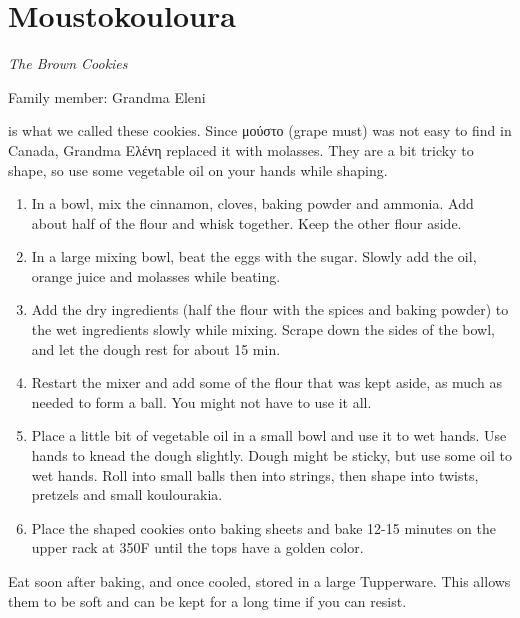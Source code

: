 \chapter{Moustokouloura}
\label{ch:moustokouloura}


\textit{The Brown Cookies}

Family member: Grandma Eleni

 is what we called these cookies. Since \textgreek{μούστο} (grape must) was not easy to find in Canada, Grandma \textgreek{Ελένη} replaced it with molasses. They are a bit tricky to shape, so use some vegetable oil on your hands while shaping.

\begin{enumerate}
    \item In a bowl, mix the cinnamon, cloves, baking powder and ammonia. Add about half of the flour and whisk together. Keep the other flour aside.
    \item In a large mixing bowl, beat the eggs with the sugar. Slowly add the oil, orange juice and molasses while beating.
    \item Add the dry ingredients (half the flour with the spices and baking powder) to the wet ingredients slowly while mixing. Scrape down the sides of the bowl, and let the dough rest for about 15 min.
    \item Restart the mixer and add some of the flour that was kept aside, as much as needed to form a ball. You might not have to use it all.
    \item Place a little bit of vegetable oil in a small bowl and use it to wet hands. Use hands to knead the dough slightly. Dough might be sticky, but use some oil to wet hands. Roll into small balls then into strings, then shape into twists, pretzels and small koulourakia.
    \item Place the shaped cookies onto baking sheets and bake 12-15 minutes on the upper rack at 350\degree F until the tops have a golden color.
\end{enumerate}

Eat soon after baking, and once cooled, stored in a large Tupperware. This allows them to be soft and can be kept for a long time if you can resist.

